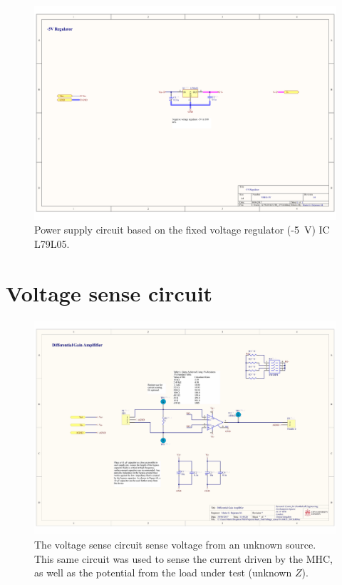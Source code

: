 \begin{landscape}
	\begin{figure}[!htpb]
		\centering
		\includegraphics[width=\paperwidth,keepaspectratio]{MHC_PS_N5}
		\caption[Negative power supply (\SI{-5}{\volt}) for the modified Howland circuit]{Power supply circuit based on the fixed voltage regulator (-\SI{5}{\volt}) IC L79L05.}
		\label{fig:MHC PS -5}
	\end{figure}
\end{landscape}

\section*{Voltage sense circuit}
\label{Appendix: VSense}
\begin{figure}[!htpb]
	\centering
	\includegraphics[width=0.9\paperwidth,keepaspectratio,angle=90]{VSense}
	\caption[Schematic of the voltage sense circuit]{The voltage sense circuit sense voltage from an unknown source. This same circuit was used to sense the current driven by the MHC, as well as the potential from the load under test (unknown $Z$).}
	\label{fig:Voltage sense}
\end{figure}

